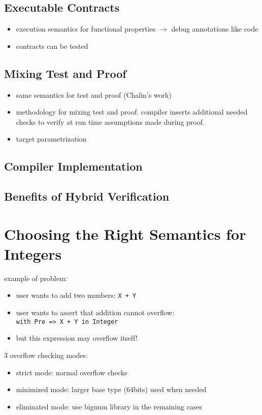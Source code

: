 \documentclass[sttt,draft]{svjour}
\begin{document}
\subsection{Executable Contracts}

\begin{itemize}
\item execution semantics for functional properties $\rightarrow$ debug
  annotations like code
\item contracts can be tested
\end{itemize}

\subsection{Mixing Test and Proof}
\begin{itemize}
\item same semantics for test and proof (Chalin's work)
\item methodology for mixing test and proof. compiler inserts additional needed
  checks to verify at run time assumptions made during proof.
\item target parametrization
\end{itemize}

\subsection{Compiler Implementation}

\subsection{Benefits of Hybrid Verification}


\section{Choosing the Right Semantics for Integers}
\label{overflowsemantics}

example of problem:
\begin{itemize}
\item user wants to add two numbers: \verb|X + Y|
\item user wants to assert that addition cannot overflow:\\
  \verb|with Pre => X + Y in Integer|
\item but this expression may overflow itself!
\end{itemize}

3 overflow checking modes:
\begin{itemize}
\item strict mode: normal overflow checks
\item minimized mode: larger base type (64bits) used when needed
\item eliminated mode: use bignum library in the remaining cases
\end{itemize}
\end{document}
